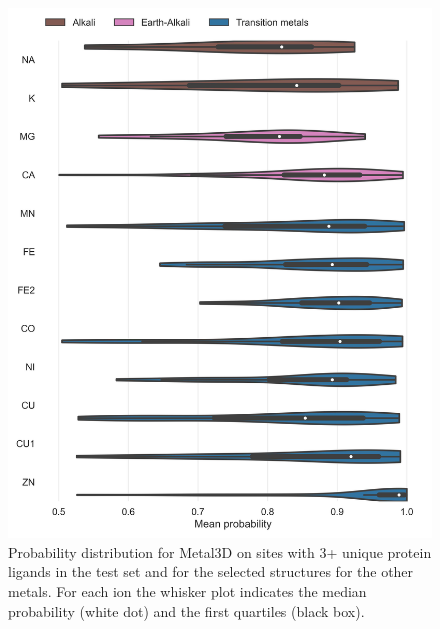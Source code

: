 \documentclass[ lineno,
  9pt]{elife}
\newenvironment{fignos:tagged-figure}[1][]{
  \let\oldthefigure\thefigure
  \let\oldtheHfigure\theHfigure
  \renewcommand{\thefigure}{#1}
  \renewcommand{\theHfigure}{#1}
}{
  \let\thefigure\oldthefigure
  \let\theHfigure\oldtheHfigure
  \addtocounter{figure}{-1}
}
\begin{document}
\begin{fignos:tagged-figure}[S6]

\begin{figure}
\hypertarget{fig:selectivity-probability-metal3d}{%
\centering
\includegraphics{images/probability_violin.jpg}
\caption{Probability distribution for Metal3D on sites with 3+ unique protein ligands in the test set and for the selected structures for the other metals. For each ion the whisker plot indicates the median probability (white dot) and the first quartiles (black box).}\label{fig:selectivity-probability-metal3d}
}
\end{figure}

\end{fignos:tagged-figure}
\end{document}
